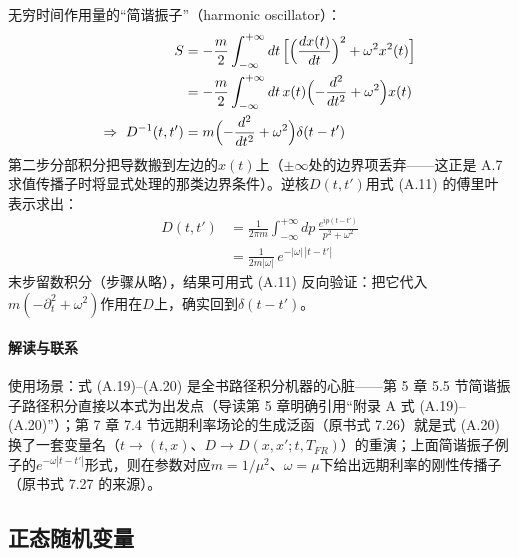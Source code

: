 无穷时间作用量的“简谐振子”（harmonic oscillator）：
\begin{align*}
S&=-\frac{m}{2}\int_{-\infty}^{+\infty}dt\,
\Bigl[\Bigl(\frac{dx(t)}{dt}\Bigr)^{2}+\omega^2 x^2(t)\Bigr]\\
&=-\frac{m}{2}\int_{-\infty}^{+\infty}dt\,
x(t)\Bigl(-\frac{d^2}{dt^2}+\omega^2\Bigr)x(t)\\
\Rightarrow\ D^{-1}(t,t')
&=m\Bigl(-\frac{d^2}{dt^2}+\omega^2\Bigr)\delta(t-t')
\end{align*}
第二步分部积分把导数搬到左边的$x(t)$上（$\pm\infty$处的边界项丢弃——这正是 A.7 求值传播子时将显式处理的那类边界条件）。逆核$D(t,t')$用式 (A.11) 的傅里叶表示求出：
\begin{align*}
D(t,t')&=\frac{1}{2\pi m}\int_{-\infty}^{+\infty}
dp\,\frac{e^{ip(t-t')}}{p^2+\omega^2}\\
&=\frac{1}{2m|\omega|}\,e^{-|\omega|\,|t-t'|}
\end{align*}
末步留数积分（步骤从略），结果可用式 (A.11) 反向验证：把它代入$m(-\partial_t^2+\omega^2)$作用在$D$上，确实回到$\delta(t-t')$。

\paragraph{解读与联系}
使用场景：式 (A.19)--(A.20) 是全书路径积分机器的心脏——第 5 章 5.5 节简谐振子路径积分直接以本式为出发点（导读第 5 章明确引用“附录 A 式 (A.19)--(A.20)”）；第 7 章 7.4 节远期利率场论的生成泛函（原书式 7.26）就是式 (A.20) 换了一套变量名（$t\to(t,x)$、$D\to D(x,x';t,T_{FR})$）的重演；上面简谐振子例子的$e^{-\omega|t-t'|}$形式，则在参数对应$m=1/\mu^2$、$\omega=\mu$下给出远期利率的刚性传播子（原书式 7.27 的来源）。

\subsection{正态随机变量}

